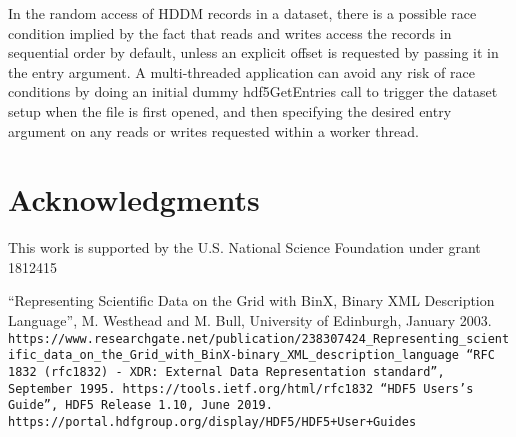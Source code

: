\documentclass{revtex4}
\begin{document}
In the random access of HDDM records in a dataset, there is a
possible race condition implied by the fact that reads and writes access the
records in sequential order by default, unless an explicit offset is requested
by passing it in the entry argument. A multi-threaded application can avoid any
risk of race conditions by doing an initial dummy hdf5GetEntries call to 
trigger the dataset setup when the file is first opened, and then specifying
the desired entry argument on any reads or writes requested within a worker thread.

\section*{Acknowledgments}

This work is supported by the U.S. National Science Foundation under grant 1812415

\begin{thebibliography}{d}
``Representing Scientific Data on the Grid with BinX, Binary XML Description
Language'', M. Westhead and M. Bull, University of Edinburgh, January 2003.
\tt{https://www.researchgate.net/publication/238307424\_Representing\_scientific\_data\_on\_the\_Grid\_with\_BinX-binary\_XML\_description\_language}
``RFC 1832 (rfc1832) - XDR: External Data Representation standard'',
September 1995.
\tt{https://tools.ietf.org/html/rfc1832}
``HDF5 Users's Guide'', HDF5 Release 1.10, June 2019.
\tt{https://portal.hdfgroup.org/display/HDF5/HDF5+User+Guides}
\end{thebibliography}
\end{document}
